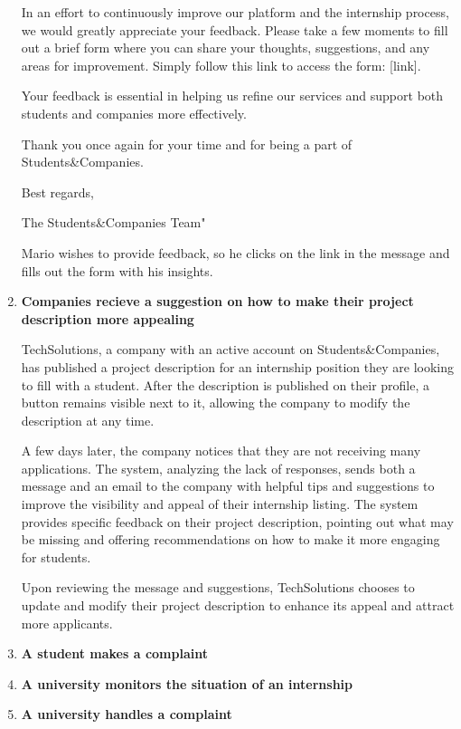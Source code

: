 \begin{enumerate}
    In an effort to continuously improve our platform and the internship process, we would greatly appreciate your feedback. Please take a few moments to fill out a brief form where you can share your thoughts, suggestions, and any areas for improvement. Simply follow this link to access the form: [link].

    Your feedback is essential in helping us refine our services and support both students and companies more effectively.

    Thank you once again for your time and for being a part of Students\&Companies.

    Best regards,
    
    The Students\&Companies Team"

    Mario wishes to provide feedback, so he clicks on the link in the message and fills out the form with his insights.

    \item \textbf{Companies recieve a suggestion on how to make their project description more appealing}

    TechSolutions, a company with an active account on Students\&Companies, has published a project description for an internship position they are looking to fill with a student. After the description is published on their profile, a button remains visible next to it, allowing the company to modify the description at any time.

    A few days later, the company notices that they are not receiving many applications. The system, analyzing the lack of responses, sends both a message and an email to the company with helpful tips and suggestions to improve the visibility and appeal of their internship listing. The system provides specific feedback on their project description, pointing out what may be missing and offering recommendations on how to make it more engaging for students.

    Upon reviewing the message and suggestions, TechSolutions chooses to update and modify their project description to enhance its appeal and attract more applicants.
    \item \textbf{A student makes a complaint}

    

    \item \textbf{A university monitors the situation of an internship}

    \item \textbf{A university handles a complaint}


\end{enumerate}
